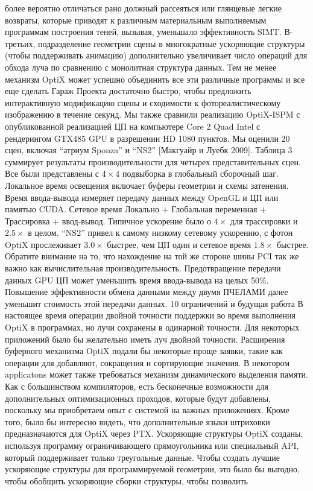 более вероятно отличаться рано должный рассеяться или глянцевые легкие возвраты, которые приводят к различным материальным выполняемым программам построения теней, вызывая, уменьшало эффективность SIMT. В-третьих, подразделение геометрии сцены в многократные ускоряющие структуры (чтобы поддерживать анимацию) дополнительно увеличивает число операций для обхода луча по сравнению с
монолитная структура данных. Тем не менее механизм OptiX может успешно объединить все эти различные программы и все еще сделать Гараж Проекта достаточно быстро, чтобы предложить интерактивную модификацию сцены и сходимости к фотореалистическому изображению в течение секунд.
Мы также сравнили реализацию OptiX-ISPM с опубликованной реализацией ЦП на компьютере Core 2 Quad Intel с рендерингом GTX485 GPU в разрешении HD 1080 пунктов. Мы оценили 20 сцен, включая “атриум Sponza” и “NS2” [Макгуайр и Луебк 2009]. Таблица 3 суммирует результаты производительности для четырех представительных сцен. Все были представлены с $4\times4$ подвыборка в
глобальный сборочный шаг. Локальное время освещения включает буферы геометрии и схемы затенения. Время ввода-вывода измеряет передачу данных между OpenGL и ЦП или памятью CUDA. Сетевое время Локально + Глобальная переменная + Трассировка + ввод-вывод. Типичное ускорение было о $4\times$ для трассировки и $2.5\times$ в целом. “NS2” привел к самому низкому сетевому ускорению, с
фотон OptiX прослеживает $3.0\times$ быстрее, чем ЦП один и сетевое время $1.8\times$ быстрее. Обратите внимание на то, что нахождение на той же стороне шины PCI так же важно как вычислительная производительность. Предотвращение передачи данных GPU ЦП может уменьшить время ввода-вывода на целых 50\%. Повышение эффективности обмена данными между двумя ПЧЕЛАМИ далее уменьшит
стоимость этой передачи данных.
10 ограничений и будущая работа
В настоящее время операции двойной точности поддержки во время выполнения OptiX в программах, но лучи сохранены в одинарной точности. Для некоторых приложений было бы желательно иметь луч двойной точности. Расширения буферного механизма OptiX подали бы некоторые проще заявки, такие как операции для добавляют, сокращения и сортирующие значения. В некотором applicatons может также требоваться механизм динамического выделения памяти. Как с большинством компиляторов, есть бесконечные возможности для дополнительных оптимизационных проходов, которые будут добавлены, поскольку мы приобретаем опыт
с системой на важных приложениях. Кроме того, было бы интересно видеть, что дополнительные языки штриховки предназначаются для OptiX через PTX.
Ускоряющие структуры OptiX созданы, используя программу ограничивающего прямоугольника или специальный API, который поддерживает только треугольные данные. Чтобы создать лучшие ускоряющие структуры для программируемой геометрии, это было бы выгодно, чтобы обобщить ускоряющие сборки структуры, чтобы позволить
